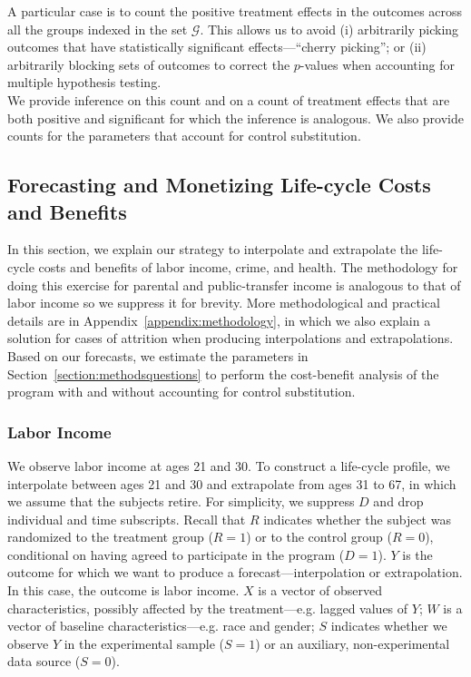 \noindent A particular case is to count the positive treatment effects in the outcomes across all the groups indexed in the set $\mathcal{G}$. This allows us to avoid (i) arbitrarily picking outcomes that have statistically significant effects---``cherry picking''; or (ii) arbitrarily blocking sets of outcomes to correct the $p$-values when accounting for multiple hypothesis testing.\\

\noindent We provide inference on this count and on a count of treatment effects that are both positive and significant for which the inference is analogous. We also provide counts for the parameters that account for control substitution.

\subsection{Forecasting and Monetizing Life-cycle Costs and Benefits} \label{section:cbamethodology}

\noindent In this section, we explain our strategy to interpolate and extrapolate the life-cycle costs and benefits of labor income, crime, and health. The methodology for doing this exercise for parental and public-transfer income is analogous to that of labor income so we suppress it for brevity. More methodological and practical details are in Appendix~\ref{appendix:methodology}, in which we also explain a solution for cases of attrition when producing interpolations and extrapolations. Based on our forecasts, we estimate the parameters in Section~\ref{section:methodsquestions} to perform the cost-benefit analysis of the program with and without accounting for control substitution.

\subsubsection{Labor Income}

\noindent We observe labor income at ages 21 and 30. To construct a life-cycle profile, we interpolate between ages 21 and 30 and extrapolate from ages 31 to 67, in which we assume that the subjects retire. For simplicity, we suppress $D$ and drop individual and time subscripts. Recall that $R$ indicates whether the subject was randomized to the treatment group ($R=1$) or to the control group ($R=0$), conditional on having agreed to participate in the program ($D = 1$). $Y$ is the outcome for which we want to produce a forecast---interpolation or extrapolation. In this case, the outcome is labor income. $X$ is a vector of observed characteristics, possibly affected by the treatment---e.g. lagged values of $Y$; $W$ is a vector of baseline characteristics---e.g. race and gender; $S$ indicates whether we observe $Y$ in the experimental sample ($S=1$) or an auxiliary, non-experimental data source ($S=0$).\\

